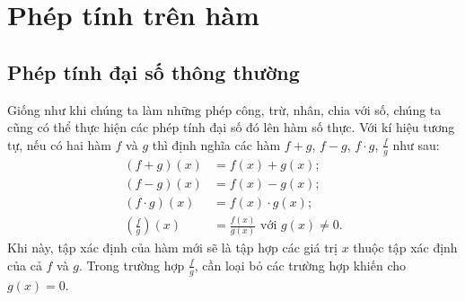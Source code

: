 \section{Phép tính trên hàm}

\subsection{Phép tính đại số thông thường}

Giống như khi chúng ta làm những phép công, trừ, nhân, chia với số, chúng ta cũng có thể thực hiện các phép tính đại số đó lên hàm số thực. Với kí hiệu tương tự, nếu có hai hàm $f$ và $g$ thì định nghĩa các hàm $f+g$, $f-g$, $f\cdot g$, $\frac{f}{g}$ như sau:
\begin{align*}
    (f + g)(x) &= f(x) + g(x);\\
    (f - g)(x) &= f(x) - g(x);\\
    (f \cdot g)(x) &= f(x) \cdot g(x);\\
    \left(\frac{f}{g}\right)(x) &= \frac{f(x)}{g(x)} \text{ với } g(x) \neq 0.
\end{align*}
Khi này, tập xác định của hàm mới sẽ là tập hợp các giá trị $x$ thuộc tập xác định của cả $f$ và $g$. Trong trường hợp $\frac{f}{g}$, cần loại bỏ các trường hợp khiến cho $g(x) = 0$.

